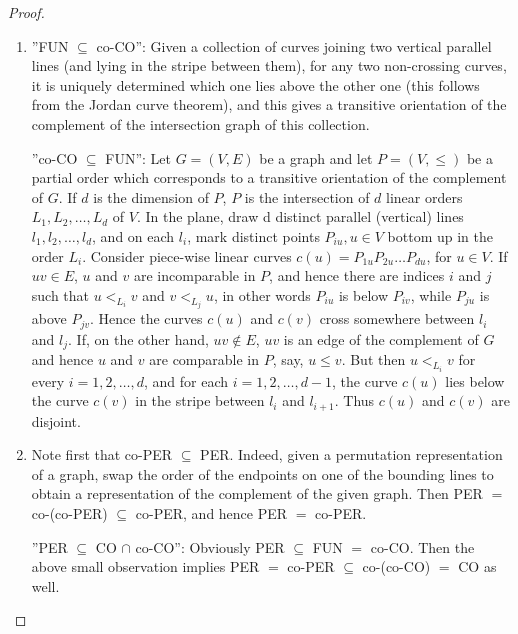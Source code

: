 \begin{proof}
	\begin{enumerate}
		\item ”FUN $\subseteq$ co-CO”: Given a collection of curves joining two vertical parallel lines (and lying in the stripe between them), for any two non-crossing curves, it is uniquely determined which one lies above the other one (this follows from the Jordan curve theorem), and this gives a transitive orientation of the complement of the intersection graph of this collection.
		
		”co-CO $\subseteq$ FUN”: Let $G = (V, E)$ be a graph and let $P = (V, \leq)$ be a partial order which corresponds to a transitive orientation of the complement of $G$. If $d$ is the dimension of $P$, $P$ is the intersection of $d$ linear orders $L_1, L_2 , \dots, L_d$ of $V$. In the plane, draw d distinct parallel (vertical) lines $l_1, l_2, \dots, l_d$, and on each $l_i$, mark distinct points $P_{iu}, u \in V$ bottom up in the order $L_i$. Consider piece-wise linear curves $c(u) = P_{1u} P_{2u} \dots P_{du}$, for $u \in V$. If $uv \in E$, $u$ and $v$ are incomparable in $P$,	and hence there are indices $i$ and $j$ such that $u <_{L_i} v$ and $v <_{L_j} u$, in other words $P_{iu}$ is below $P_{iv}$, while $P_{ju}$ is above $P_{jv}$. Hence the curves $c(u)$ and $c(v)$ cross somewhere between $l_i$ and $l_j$. If, on the other hand, $uv \notin E$, $uv$ is an edge of the complement of $G$ and hence $u$ and $v$ are comparable in $P$, say, $u \leq v$. But then $u <_{L_i} v$ for every $i = 1, 2, \dots, d$, and for each $i = 1, 2, \dots, d - 1$, the curve $c(u)$	lies below the curve $c(v)$ in the stripe between $l_i$ and $l_{i+1}$. Thus $c(u)$ and $c(v)$ are disjoint.
		
		\item Note first that co-PER $\subseteq$ PER. Indeed, given a permutation representation of a graph, swap	the order of the endpoints on one of the bounding lines to obtain a representation of the complement of the given graph. Then PER $=$ co-(co-PER) $\subseteq$ co-PER, and hence PER $=$ co-PER.
		
		”PER $\subseteq$ CO $\cap$ co-CO”: Obviously PER $\subseteq$ FUN $=$ co-CO. Then the above small observation implies PER $=$ co-PER $\subseteq$ co-(co-CO) $=$ CO as well.


\end{enumerate}
\end{proof}
